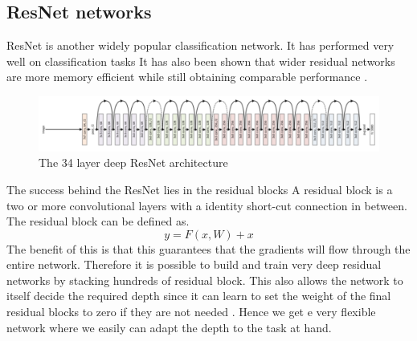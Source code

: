 \documentclass{kththesis}
\begin{document}
\subsection{ResNet networks}
ResNet is another widely popular classification network. It has performed very well on classification tasks \parencite{he_identity_2016, szegedy_inception-v4_2016} It has also been shown that wider residual networks are more memory efficient while still obtaining comparable performance \parencite{wu_wider_2016, zagoruyko_wide_2016}.
\begin{figure}[h!]
  \centering
      \includegraphics[scale=0.25]{resnet}
  \caption{The 34 layer deep ResNet architecture \parencite{simonyan_very_2014}} \label{fig:vgg}
\end{figure}
The success behind the ResNet lies in the residual blocks A residual block is a two or more convolutional layers with a identity short-cut connection in between. The residual block can be defined as.
\begin{equation}
y=F(x, W) + x
\end{equation}
The benefit of this is that this guarantees that the gradients will flow through the entire network. Therefore it is possible to build and train very deep residual networks by stacking hundreds of residual block. This also allows the network to itself decide the required depth since it can learn to set the weight of the final residual blocks to zero if they are not needed \parencite{he_deep_2015}. Hence we get e very flexible network where we easily can adapt the depth to the task at hand.
\end{document}
